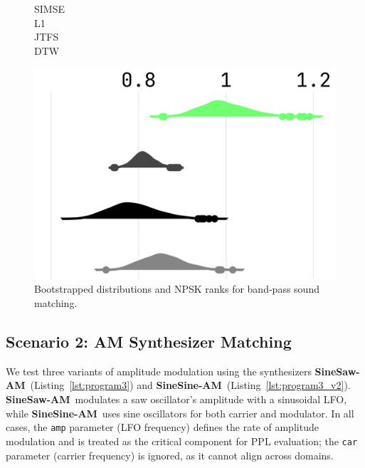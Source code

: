 \documentclass[runningheads]{llncs}
\newcommand{\FMMod}{\textbf{SineSaw-AM}\xspace}
\newcommand{\FMModvtwo}{\textbf{SineSine-AM}\xspace}
\begin{document}
\begin{figure}[htbp]
  \centering
  \scriptsize
  \begin{minipage}{\columnwidth}
    \begin{minipage}{0.10\columnwidth}
      \raggedleft
      \vspace{0.5cm}
      SIMSE\\[0.6cm]
      L1\\[0.65cm]
      JTFS\\[0.65cm]
      DTW
    \end{minipage}%
    \begin{minipage}{0.88\columnwidth}
      \centering
      \includegraphics[width=\linewidth]{images/npsk_ood_P_Loss_3.png}
    \end{minipage}
  \end{minipage}
  \caption{Bootstrapped distributions and NPSK ranks for band-pass sound matching.}
  \label{fig:npsk_BP}
\end{figure}

\subsection{Scenario 2: AM Synthesizer Matching}

We test three variants of amplitude modulation using the synthesizers \FMMod\ (Listing~\ref{lst:program3}) and \FMModvtwo\ (Listing~\ref{lst:program3_v2}).  
\FMMod\ modulates a saw oscillator’s amplitude with a sinusoidal LFO, while \FMModvtwo\ uses sine oscillators for both carrier and modulator.  
In all cases, the \texttt{amp} parameter (LFO frequency) defines the rate of amplitude modulation and is treated as the critical component for PPL evaluation; the \texttt{car} parameter (carrier frequency) is ignored, as it cannot align across domains.
\end{document}
